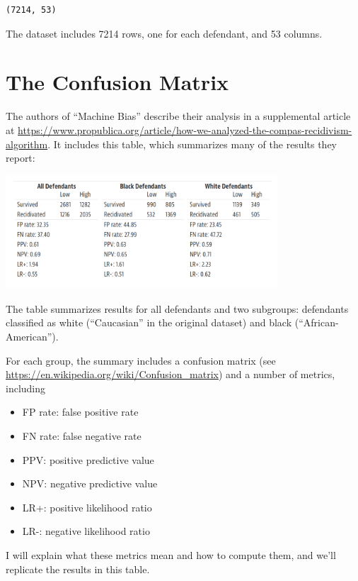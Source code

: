\begin{lstlisting}[style=output]
(7214, 53)
\end{lstlisting}

The dataset includes 7214 rows, one for each defendant, and 53 columns.

\hypertarget{the-confusion-matrix}{%
\section{The Confusion Matrix}\label{the-confusion-matrix}}

The authors of ``Machine Bias'' describe their analysis in a
supplemental article at
\url{https://www.propublica.org/article/how-we-analyzed-the-compas-recidivism-algorithm}.
It includes this table, which summarizes many of the results they
report:

\includegraphics[width=4in]{figs/machine_bias_table.png}

The table summarizes results for all defendants and two subgroups:
defendants classified as white (``Caucasian'' in the original dataset)
and black (``African-American'').

For each group, the summary includes a confusion matrix (see
\url{https://en.wikipedia.org/wiki/Confusion_matrix}) and a number of
metrics, including

\begin{itemize}
\tightlist
\item
  FP rate: false positive rate
\item
  FN rate: false negative rate
\item
  PPV: positive predictive value
\item
  NPV: negative predictive value
\item
  LR+: positive likelihood ratio
\item
  LR-: negative likelihood ratio
\end{itemize}

I will explain what these metrics mean and how to compute them, and
we'll replicate the results in this table.


